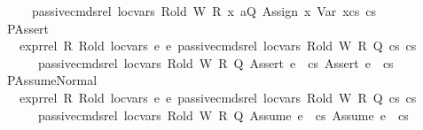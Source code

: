 \begin{isabellebody}
\ \ \ \ \ \ \ passive{\isacharunderscore}{\kern0pt}cmds{\isacharunderscore}{\kern0pt}rel\ loc{\isacharunderscore}{\kern0pt}vars\ R{\isacharunderscore}{\kern0pt}old\ W\ R\ {\isacharparenleft}{\kern0pt}{\isacharparenleft}{\kern0pt}x{}{\isacharcomma}{\kern0pt}\ a{\isacharparenright}{\kern0pt}{\isacharhash}{\kern0pt}Q{\isacharparenright}{\kern0pt}\ {\isacharparenleft}{\kern0pt}{\isacharparenleft}{\kern0pt}Assign\ x{}\ {\isacharparenleft}{\kern0pt}Var\ x{}{\isacharprime}{\kern0pt}{\isacharparenright}{\kern0pt}{\isacharparenright}{\kern0pt}{\isacharhash}{\kern0pt}cs{}{\isacharparenright}{\kern0pt}\ cs{}{\isachardoublequoteclose}\isanewline
\ \ {\isacharbar}{\kern0pt}\ PAssert{\isacharcolon}{\kern0pt}\ \isanewline
\ \ \ \ {\isachardoublequoteopen}{\isasymlbrakk}\ expr{\isacharunderscore}{\kern0pt}rel\ R\ R{\isacharunderscore}{\kern0pt}old\ loc{\isacharunderscore}{\kern0pt}vars\ e{}\ e{}{\isacharsemicolon}{\kern0pt}\ passive{\isacharunderscore}{\kern0pt}cmds{\isacharunderscore}{\kern0pt}rel\ loc{\isacharunderscore}{\kern0pt}vars\ R{\isacharunderscore}{\kern0pt}old\ W\ R\ Q\ cs{}\ cs{}\ {\isasymrbrakk}\ {\isasymLongrightarrow}\ \isanewline
\ \ \ \ \ \ \ \ passive{\isacharunderscore}{\kern0pt}cmds{\isacharunderscore}{\kern0pt}rel\ loc{\isacharunderscore}{\kern0pt}vars\ R{\isacharunderscore}{\kern0pt}old\ W\ R\ Q\ {\isacharparenleft}{\kern0pt}{\isacharparenleft}{\kern0pt}Assert\ e{}{\isacharparenright}{\kern0pt}\ {\isacharhash}{\kern0pt}\ cs{}{\isacharparenright}{\kern0pt}\ {\isacharparenleft}{\kern0pt}{\isacharparenleft}{\kern0pt}Assert\ e{}{\isacharparenright}{\kern0pt}\ {\isacharhash}{\kern0pt}\ cs{}{\isacharparenright}{\kern0pt}{\isachardoublequoteclose}\isanewline
\ \ {\isacharbar}{\kern0pt}\ PAssumeNormal{\isacharcolon}{\kern0pt}\ \isanewline
\ \ \ \ {\isachardoublequoteopen}{\isasymlbrakk}\ expr{\isacharunderscore}{\kern0pt}rel\ R\ R{\isacharunderscore}{\kern0pt}old\ loc{\isacharunderscore}{\kern0pt}vars\ e{}\ e{}{\isacharsemicolon}{\kern0pt}\ passive{\isacharunderscore}{\kern0pt}cmds{\isacharunderscore}{\kern0pt}rel\ loc{\isacharunderscore}{\kern0pt}vars\ R{\isacharunderscore}{\kern0pt}old\ W\ R\ Q\ cs{}\ cs{}\ {\isasymrbrakk}\ {\isasymLongrightarrow}\ \isanewline
\ \ \ \ \ \ \ \ passive{\isacharunderscore}{\kern0pt}cmds{\isacharunderscore}{\kern0pt}rel\ loc{\isacharunderscore}{\kern0pt}vars\ R{\isacharunderscore}{\kern0pt}old\ W\ R\ Q\ {\isacharparenleft}{\kern0pt}{\isacharparenleft}{\kern0pt}Assume\ e{}{\isacharparenright}{\kern0pt}\ {\isacharhash}{\kern0pt}\ cs{}{\isacharparenright}{\kern0pt}\ {\isacharparenleft}{\kern0pt}{\isacharparenleft}{\kern0pt}Assume\ e{}{\isacharparenright}{\kern0pt}\ {\isacharhash}{\kern0pt}\ cs{}{\isacharparenright}{\kern0pt}{\isachardoublequoteclose}\isanewline

\end{isabellebody}
